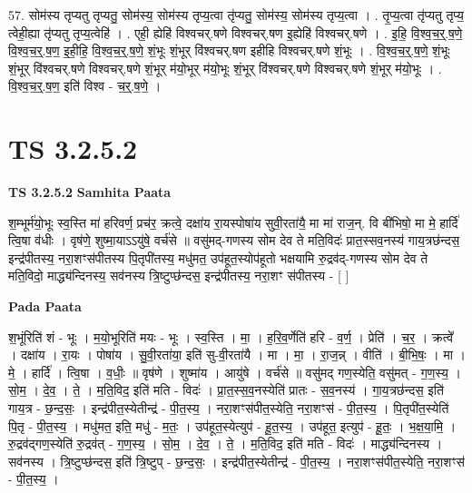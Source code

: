 \documentclass[17pt]{extarticle}
\begin{document}
57. सोम॑स्य तृप्यतु तृप्यतु॒ सोम॑स्य॒ सोम॑स्य तृप्य॒त्वा तृ॑प्यतु॒ सोम॑स्य॒ सोम॑स्य तृप्य॒त्वा । . तृ॒प्य॒त्वा तृ॑प्यतु तृप्य॒ त्वेही॒ह्या तृ॑प्यतु तृप्य॒त्वेहि॑ । . एही॒ ह्येहि॑ विश्वचर्.षणे विश्वचर्.षण इ॒ह्येहि॑ विश्वचर्.षणे । . इ॒हि॒ वि॒श्व॒च॒र्॒.ष॒णे॒ वि॒श्व॒च॒र्॒.ष॒ण॒ इ॒ही॒हि॒ वि॒श्व॒च॒र्॒.ष॒णे॒ शं॒भूः शं॒भूर् वि॑श्वचर्.षण इहीहि विश्वचर्.षणे शं॒भूः । . वि॒श्व॒च॒र्॒.ष॒णे॒ शं॒भूः शं॒भूर् वि॑श्वचर्.षणे विश्वचर्.षणे शं॒भूर् म॑यो॒भूर् म॑यो॒भूः शं॒भूर् वि॑श्वचर्.षणे विश्वचर्.षणे शं॒भूर् म॑यो॒भूः । . वि॒श्व॒च॒र्॒.ष॒ण॒ इति॑ विश्व - च॒र्॒.ष॒णे॒ । \newline
\pagebreak
{}

\section{ TS 3.2.5.2 }

\textbf{TS 3.2.5.2 } \newline
\textbf{Samhita Paata} \newline

श॒म्भूर्म॑यो॒भूः स्व॒स्ति मा॑ हरिवर्ण॒ प्रच॑र॒ क्रत्वे॒ दक्षा॑य रा॒यस्पोषा॑य सुवी॒रता॑यै॒ मा मा॑ राज॒न्. वि बी॑भिषो॒ मा मे॒ हार्दि॑ त्वि॒षा व॑धीः । वृष॑णे॒ शुष्मा॒याऽऽयु॑षे॒ वर्च॑से ॥ वसु॑मद्-गणस्य सोम देव ते मति॒विदः॑ प्रात॒स्सव॒नस्य॑ गाय॒त्रछ॑न्दस॒ इन्द्र॑पीतस्य॒ नरा॒शꣳस॑पीतस्य पि॒तृपी॑तस्य॒ मधु॑मत॒ उप॑हूत॒स्योप॑हूतो भक्षयामि रु॒द्रव॑द्-गणस्य सोम देव ते मति॒विदो॒ माद्ध्य॑न्दिनस्य॒ सव॑नस्य त्रि॒ष्टुप्छ॑न्दस॒ इन्द्र॑पीतस्य॒ नरा॒शꣳ स॑पीतस्य - [  ] \newline

\textbf{Pada Paata} \newline

श॒भूंरिति॑ शं - भूः । म॒यो॒भूरिति॑ मयः - भूः । स्व॒स्ति । मा॒ । ह॒रि॒व॒र्णेति॑ हरि - व॒र्ण॒ । प्रेति॑ । च॒र॒ । क्रत्वे᳚ । दक्षा॑य । रा॒यः । पोषा॑य । सु॒वी॒रता॑या॒ इति॑ सु-वी॒रता॑यै । मा । मा॒ । रा॒ज॒न्न् । वीति॑ । बी॒भि॒षः॒ । मा । मे॒ । हार्दि॑ । त्वि॒षा । व॒धीः॒ ॥ वृष॑णे । शुष्मा॑य । आयु॑षे । वर्च॑से ॥ वसु॑मद् गण॒स्येति॒ वसु॑मत् - ग॒ण॒स्य॒ । सो॒म॒ । दे॒व॒ । ते॒ । म॒ति॒विद॒ इति॑ मति - विदः॑ । प्रा॒त॒स्स॒व॒नस्येति॑ प्रातः - स॒व॒नस्य॑ । गा॒य॒त्रछ॑न्दस॒ इति॑ गाय॒त्र - छ॒न्द॒सः॒ । इन्द्र॑पीत॒स्येतीन्द्र॑ - पी॒त॒स्य॒ । नरा॒शꣳस॑पीत॒स्येति॒ नरा॒शꣳस॑ - पी॒त॒स्य॒ । पि॒तृपी॑त॒स्येति॑ पि॒तृ - पी॒त॒स्य॒ । मधु॑मत॒ इति॒ मधु॑ - म॒तः॒ । उप॑हूत॒स्येत्युप॑ - हू॒त॒स्य॒ । उप॑हूत॒ इत्युप॑ - हू॒तः॒ । भ॒क्ष॒या॒मि॒ । रु॒द्रव॑द्गण॒स्येति॑ रु॒द्रव॑त् - ग॒ण॒स्य॒ । सो॒म॒ । दे॒व॒ । ते॒ । म॒ति॒विद॒ इति॑ मति - विदः॑ । माद्ध्य॑न्दिनस्य । सव॑नस्य । त्रि॒ष्टुप्छ॑न्दस॒ इति॑ त्रि॒ष्टुप् - छ॒न्द॒सः॒ । इन्द्र॑पीत॒स्येतीन्द्र॑ - पी॒त॒स्य॒ । नरा॒शꣳस॑पीत॒स्येति॒ नरा॒शꣳस॑ - पी॒त॒स्य॒ ।  \newline
\end{document}
